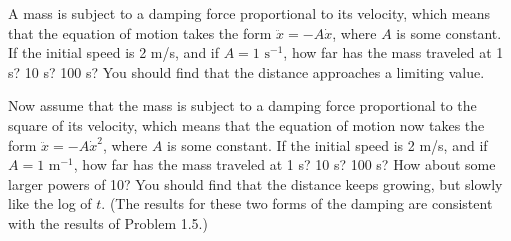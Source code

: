 A mass is subject to a damping force proportional to its velocity, which means that the equation of motion takes the form $\ddot{x} = -A\dot{x}$, where $A$ is some constant. If the initial speed is 2 m/s, and if $A = 1 \text{ s}^{-1}$, how far has the mass traveled at 1 s? 10 s? 100 s? You should find that the distance approaches a limiting value.

Now assume that the mass is subject to a damping force proportional to the square of its velocity, which means that the equation of motion now takes the form $\ddot{x} = -A\dot{x}^2$, where $A$ is some constant. If the initial speed is 2 m/s, and if $A = 1 \text{ m}^{-1}$, how far has the mass traveled at 1 s? 10 s? 100 s? How about some larger powers of 10? You should find that the distance keeps growing, but slowly like the log of $t$. (The results for these two forms of the damping are consistent with the results of Problem 1.5.)